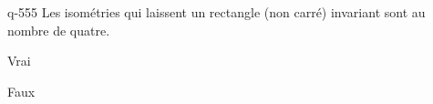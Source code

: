 \begin{truefalse}{q-555}
Les isométries qui laissent un rectangle (non carré) invariant sont au nombre de quatre.
\item* Vrai
\item Faux
\end{truefalse}

